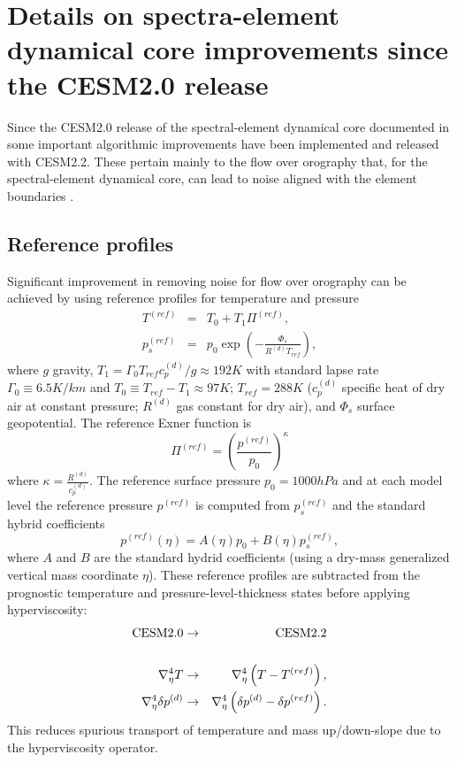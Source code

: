 \documentclass[draft]{agujournal2019}
\begin{document}
\section{Details on spectra-element dynamical core improvements since the CESM2.0 release}\label{sec:a1}
Since the CESM2.0 release of the spectral-element dynamical core documented in  some important algorithmic improvements have been implemented and released with CESM2.2. These pertain mainly to the flow over orography that, for the spectral-element dynamical core, can lead to noise aligned with the element boundaries \cite{HL2018MWR}.
\subsection{Reference profiles}
Significant improvement in removing noise for flow over orography can be achieved by using reference profiles for temperature and pressure
\begin{eqnarray}
  T^{(ref)}&=&T_0+T_1 \Pi^{(ref)},\\
  p_s^{(ref)}&=&p_0\exp{\left(-\frac{\Phi_s}{R^{(d)}T_{ref}}\right)},
\end{eqnarray}
 \cite{SJ1991QJRMS} where $g$ gravity, $T_1=\Gamma_0 T_{ref} c_p^{(d)}/g\approx 192K$ with standard lapse rate $\Gamma_0\equiv 6.5K/km$ and $T_0\equiv T_{ref}-T_1\approx 97K$; $T_{ref}=288K$ ($c_p^{(d)}$ specific heat of dry air at constant pressure; $R^{(d)}$ gas constant for dry air), and $\Phi_s$ surface geopotential. The reference Exner function is
\begin{equation}
   \Pi^{(ref)}=\left( \frac{p^{(ref)}}{p_0}\right)^{\kappa}
\end{equation}
where $\kappa=\frac{R^{(d)}}{c_p^{(d)}}$. The reference surface pressure $p_0=1000hPa$ and at each model level the reference pressure $p^{(ref)}$ is computed from $p_s^{(ref)}$ and the standard hybrid coefficients
\begin{equation}
    p^{(ref)}(\eta) = A(\eta)p_0+B(\eta)p_s^{(ref)},
\end{equation}
where $A$ and $B$ are the standard hydrid coefficients (using a dry-mass generalized vertical mass coordinate $\eta$). These reference profiles are subtracted from the prognostic temperature and pressure-level-thickness states before applying hyperviscosity:
\begin{eqnarray}
   \hbox{CESM2.0}&\rightarrow&\hbox{CESM2.2}\nonumber \\
   && \nonumber \\
  \nabla^4_\eta T &\rightarrow& \nabla^4_\eta \left(T-T^{(ref)}\right),\label{eq:hyperT}\\ 
    \nabla^4_\eta \delta p^{(d)} &\rightarrow& \nabla^4_\eta \left(\delta p^{(d)}-\delta p^{(ref)}\right).\label{eq:hyperDP}
\end{eqnarray}
This reduces spurious transport of temperature and mass up/down-slope due to the hyperviscosity operator. 
\end{document}
